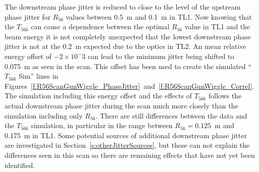 The downstream phase jitter is reduced to close to the level of the upstream phase jitter for \(R_{56}\) values between 0.5~m and 0.1~m in TL1.  Now knowing that the \(T_{566}\) can cause a dependence between the optimal \(R_{56}\) value in TL1 and the beam energy it is not completely unexpected that the lowest downstream phase jitter is not at the 0.2~m expected due to the optics in TL2. An mean relative energy offset of \(-2\times10^-3\) can lead to the minimum jitter being shifted to 0.075~m as seen in the scan. This offset has been used to create the simulated ``\(T_{566}\) Sim'' lines  in Figures~\ref{f:R56ScanGunWiggle_PhaseJitter}~and~\ref{f:R56ScanGunWiggle_Correl}. The simulation including this energy offset and the effects of \(T_{566}\) follows the actual downstream phase jitter during the scan much more closely than the simulation including only \(R_{56}\). There are still differences between the data and the \(T_{566}\) simulation, in particular in the range between \(R_{56} = 0.125\)~m and 0.175~m in TL1. Some potential sources of additional downstream phase jitter are investigated in Section~\ref{s:otherJitterSources}, but these can not explain the differences seen in this scan so there are remaining effects that have not yet been identified.

